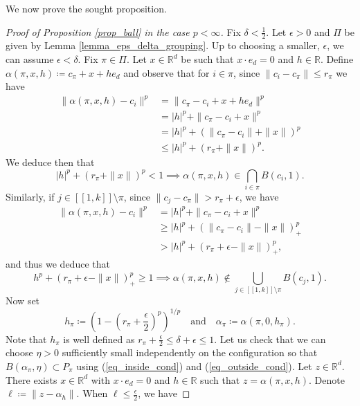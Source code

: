 \documentclass[a4paper, 11pt]{article}
\theoremstyle{plain}
\theoremstyle{definition}
\newcommand{\R}{\mathbb{R}}
\newcommand{\range}[2]{[\![#1,#2]\!]}
\numberwithin{equation}{section}
\begin{document}
We now prove the sought proposition.


\begin{proof}[Proof of Proposition \ref{prop_ball} in the case $p<\infty$]
    Fix $\delta<\frac{1}{2}$. Let $\epsilon>0$ and $\Pi$ be given by Lemma \ref{lemma_eps_delta_grouping}. Up to choosing a smaller, $\epsilon$, we can assume $\epsilon<\delta$. Fix $\pi\in\Pi$. Let $x\in\R^d$ be such that $x\cdot e_d=0$ and $h\in\R$. Define $\alpha(\pi, x, h)\coloneqq c_\pi+x+he_d$ and observe that for $i\in\pi$, since $\|c_i-c_\pi\|\leq r_\pi$ we have
        \begin{equation*}
            \begin{split}
                \|\alpha(\pi, x, h)-c_i\|^p&=\|c_\pi-c_i+x+he_d\|^p\\
                &=|h|^p+\|c_\pi-c_i+x\|^p\\
                &=|h|^p+(\|c_\pi-c_i\|+\|x\|)^p\\
                &\leq |h|^p+(r_\pi+\|x\|)^p.
            \end{split}
        \end{equation*}
    We deduce then that
        \begin{equation}
            \label{eq_inside_cond}
            |h|^p+(r_\pi+\|x\|)^p<1\implies\alpha(\pi, x, h)\in \bigcap_{i\in\pi} B(c_i, 1).
        \end{equation}
    Similarly, if $j\in\range{1}{k}\setminus\pi$, since $\|c_j-c_\pi\|>r_\pi+\epsilon$, we have 
        \begin{equation*}
            \begin{split}
                \|\alpha(\pi, x, h)-c_i\|^p&=|h|^p+\|c_\pi-c_i+x\|^p\\
                &\geq |h|^p+(\|c_\pi-c_i\|-\|x\|)_+^p\\
                &> |h|^p+(r_\pi+\epsilon-\|x\|)_+^p,
          \end{split}
        \end{equation*}
    and thus we deduce that
        \begin{equation}
            \label{eq_outside_cond}
            h^p+(r_\pi+\epsilon-\|x\|)_+^p\geq1\implies\alpha(\pi, x, h)\notin \bigcup_{j\in\range{1}{k}\setminus\pi} B(c_j, 1).
        \end{equation}
    Now set
        \[h_\pi\coloneqq\left(1-\left(r_\pi+\frac{\epsilon}{2}\right)^p\right)^{1/p}\quad\text{and}\quad\alpha_\pi\coloneqq \alpha(\pi, 0,h_\pi).\]
    Note that $h_\pi$ is well defined as $r_\pi+\frac{\epsilon}{2}\leq\delta+\epsilon\leq 1$. Let us check that we can choose $\eta>0$ sufficiently small independently on the configuration so that $B(\alpha_\pi,\eta)\subset P_\pi$ using (\ref{eq_inside_cond}) and (\ref{eq_outside_cond}). Let $z\in\R^d$. There exists $x\in\R^d$ with $x\cdot e_d=0$ and $h\in\R$ such that $z=\alpha(\pi, x, h)$. Denote $\ell\coloneqq \|z-\alpha_h\|$. When $\ell\leq\frac{\epsilon}{2}$, we have

\end{proof}
\end{document}
